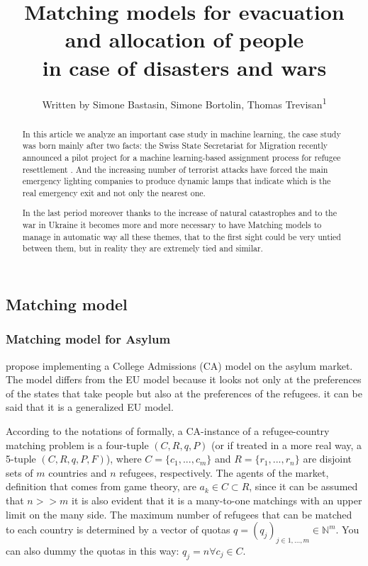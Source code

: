 \documentclass[letterpaper]{article} %
\title{Matching models for evacuation and allocation of people\\in case of disasters and wars}
\author{
    Written by Simone Bastasin, Simone Bortolin, Thomas Trevisan\textsuperscript{\rm 1}
    \\
}
\begin{document}
\maketitle

\begin{abstract}
    In this article we analyze an important case study in machine learning, the case study was born mainly after two facts:
    the Swiss State Secretariat for Migration recently announced a pilot project for a machine
    learning-based assignment process for refugee resettlement \cite{olbergml}. 
    And the increasing number of terrorist attacks have forced the main emergency lighting companies to produce dynamic lamps 
    that indicate which is the real emergency exit and not only the nearest one.

    In the last period moreover thanks to the increase of natural catastrophes and to the war in Ukraine it becomes more and more 
    necessary to have Matching models to manage in automatic way all these themes, that to the first sight could be very untied 
    between them, but in reality they are extremely tied and similar.
\end{abstract}

\noindent \cite{olbergml,basshuysen,delacretaz_2020,andersson}

\subsection{Matching model}

\cite{olbergml,basshuysen,delacretaz_2020}

\subsubsection{Matching model for Asylum}

\cite{olbergml,basshuysen,delacretaz_2020,fernandez} propose implementing a College Admissions (CA)
model on the asylum market. The model differs from the EU model\cite{basshuysen} because it looks not only at the preferences of the states that take people but also at the preferences of the refugees.
it can be said that it is a generalized EU model.

According to the notations of \cite{salles} formally, a CA-instance of a refugee-country matching problem is a four-tuple \((C, R, q, P)\)
(or if treated in a more real way, a 5-tuple \((C, R, q, P, F)\)), where
\(C = \{c_1, ..., c_m\}\) and \(R = \{r_1, ...,r_n\}\) are disjoint sets of \(m\) countries and \(n\) refugees, respectively.
The agents of the market, definition that comes from game theory, are \(a_k \in C\subset R\),
since it can be assumed that \(n >> m\) it is also evident that it is a many-to-one matchings with an upper limit on the many side.
The maximum number of refugees that can be matched to
each country is determined by a vector of quotas \(q = (q_j)_{j\in {1,...,m}} \in \mathbb{N}^m\).
You can also dummy the quotas in this way:  \(q_j = n \forall c_j \in C\).
\end{document}
